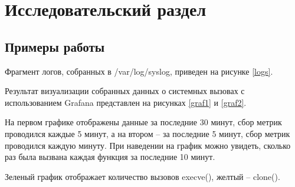 \section{Исследовательский раздел}

\subsection{Примеры работы}

Фрагмент логов, собранных в /var/log/syslog, приведен на рисунке \ref{logs}.

\begin{figure}[H]
\end{figure}

Результат визуализации собранных данных о системных вызовах с использованием Grafana представлен на рисунках \ref{graf1} и \ref{graf2}.

На первом графике отображены данные за последние 30 минут, сбор метрик проводился каждые 5 минут, а на втором -- за последние 5 минут, сбор метрик проводился каждую минуту. При наведении на график можно увидеть, сколько раз была вызвана каждая функция за последние 10 минут.

\pagebreak

Зеленый график отображает количество вызовов execve(), желтый -- clone().

\begin{figure}[H]
\end{figure}

